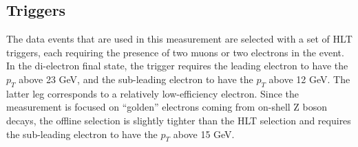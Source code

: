 \begin{small}
\begin{table}[htbp]
\caption{List of used data sets collected by the CMS in 2016. Each era contains a unique letter identifier and also specifies the date when the data processing was done. If the re-processing was run, the name contains the word ending ``v2''. Corresponding integrated luminosities are shown in the second column.
}
\label{tab:datasets}
\begin{center}
\end{center}
\end{table}

\subsection{Triggers\label{sec:triggers}}

The data events that are used in this measurement are selected with a set of HLT triggers, each requiring the presence of two muons or two electrons in the event. In the di-electron final state, the trigger requires the leading electron to have the $p_T$ above 23 GeV, and the sub-leading electron to have the $p_T$ above 12 GeV. The latter leg corresponds to a relatively low-efficiency electron. Since the measurement is focused on ``golden'' electrons coming from on-shell Z boson decays, the offline selection is slightly tighter than the HLT selection and requires the sub-leading electron to have the $p_T$ above 15 GeV.


\end{small}
